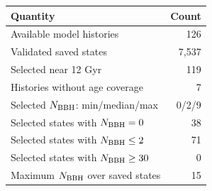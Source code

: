 \begin{ruledtabular}
\begin{tabular}{lr}
Quantity & Count \\
\hline
Available model histories & 126 \\
Validated saved states & 7,537 \\
Selected near 12 Gyr & 119 \\
Histories without age coverage & 7 \\
Selected $N_{\rm BBH}$: min/median/max & 0/2/9 \\
Selected states with $N_{\rm BBH}=0$ & 38 \\
Selected states with $N_{\rm BBH}\leq2$ & 71 \\
Selected states with $N_{\rm BBH}\geq30$ & 0 \\
Maximum $N_{\rm BBH}$ over saved states & 15 \\
\end{tabular}
\end{ruledtabular}
